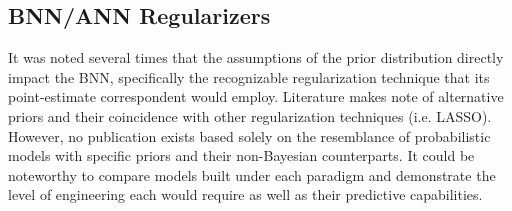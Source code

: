 \subsection{BNN/ANN Regularizers}
It was noted several times that the assumptions of the prior distribution directly impact the BNN, specifically the recognizable regularization technique that its point-estimate correspondent would employ.  Literature \cite{vladimirova2019understanding} \cite{chiuso2016regularization} makes note of alternative priors and their coincidence with other regularization techniques (i.e. LASSO).  However, no publication exists based solely on the resemblance of probabilistic models with specific priors and their non-Bayesian counterparts.  It could be noteworthy to compare models built under each paradigm and demonstrate the level of engineering each would require as well as their predictive capabilities.